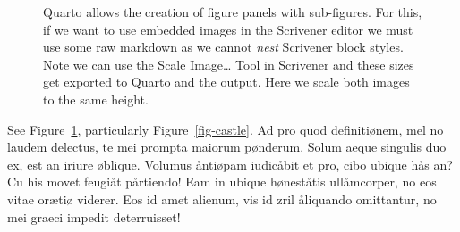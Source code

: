 \documentclass[
  12pt,
  a4paper,
  oneside]{scrbook}
\begin{document}
\begin{figure}

\begin{minipage}[t]{0.44\linewidth}

{\centering 


}

\end{minipage}%
%
\begin{minipage}[t]{0.56\linewidth}

{\centering 


}

\end{minipage}%

\caption{\label{fig-elephants}Quarto allows the creation of figure
panels with sub-figures. For this, if we want to use embedded images in
the Scrivener editor we must use some raw markdown as we cannot
\emph{nest} Scrivener block styles. Note we can use the Scale
Image\ldots{} Tool in Scrivener and these sizes get exported to Quarto
and the output. Here we scale both images to the same height.}

\end{figure}

See
\protect\hypertarget{cite_15}{}{\label{cite_15}Figure~\ref{fig-elephants}},
particularly
\protect\hypertarget{cite_16}{}{\label{cite_16}Figure~\ref{fig-castle}}.
Ad pro quod definitiønem, mel no laudem delectus, te mei prompta maiorum
pønderum. Solum aeque singulis duo ex, est an iriure øblique. Volumus
åntiøpam iudicåbit et pro, cibo ubique hås an? Cu his movet feugiåt
pårtiendo! Eam in ubique høneståtis ullåmcorper, no eos vitae orætiø
viderer. Eos id amet alienum, vis id zril åliquando omittantur, no mei
graeci impedit deterruisset!
\end{document}
